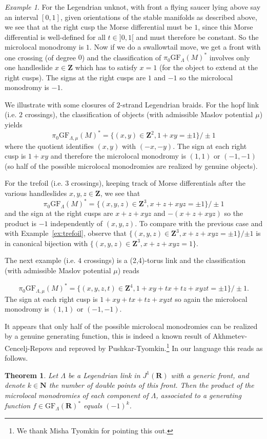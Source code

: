 \documentclass[12pt,a4paper]{article}
\numberwithin{equation}{section}
\newtheorem{thm}[equation]{Theorem}
\theoremstyle{definition}
\theoremstyle{remark}
\newtheorem{example}[equation]{Example}
\newcommand{\Z}{\mathbf{Z}}
\newcommand{\R}{\mathbf{R}}
\newcommand{\N}{\mathbf{N}}
\newcommand{\GF}{\mathrm{GF}}
\begin{document}
\begin{example}\label{ex:mumonunknot}
For the Legendrian unknot, with front a flying saucer lying above say an interval $[0,1]$, given orientations of the stable manifolds
as described above, we see that at the right cusp the Morse differential must be $1$, since this Morse
differential is well-defined for all $t\in]0,1[$ and must therefore be constant. So the microlocal monodromy is $1$.
Now if we do a swallowtail move, we get a front with one crossing (of degree $0$) and the classification of $\pi_0\GF_\Lambda(M)^*$
involves only one handleslide $x\in \Z$ which has to satisfy $x=1$ (for the object to extend at the right cusps).
The signs at the right cusps are $1$ and $-1$ so the microlocal monodromy is $-1$.
\end{example}

We illustrate with some  closures of $2$-strand Legendrian braids.
For the hopf link (i.e. $2$ crossings), the classification of objects (with admissible Maslov potential $\mu$) yields
\[\pi_0\GF_{\Lambda,\mu}(M)^*=\{(x,y)\in \Z^2, 1+xy=\pm 1\}/\pm 1\]
where the quotient identifies $(x,y)$ with $(-x,-y)$. The sign at each right cusp is $1+xy$ and therefore the
microlocal monodromy is $(1,1)$ or $(-1,-1)$ (so half of the possible
microlocal monodromies are realized by genuine objects).

For the trefoil (i.e. $3$ crossings), keeping track of Morse differentials after the various handleslides $x,y,z \in \Z$,
we see that
\[\pi_0\GF_{\Lambda}(M)^*=\{(x,y,z)\in \Z^3, x+z+xyz=\pm 1\}/\pm 1\]
and the sign at the right cusps are $x+z+xyz$ and $-(x+z+xyz)$ so the product is $-1$ independently of $(x,y,z)$.
To compare with the previous case and with Example~\ref{ex:trefoil}, observe that $\{(x,y,z)\in \Z^3, x+z+xyz=\pm 1\}/{\pm 1}$ is in canonical bijection with
$\{(x,y,z)\in \Z^3, x+z+xyz=1\}$.

The next example (i.e. $4$ crossings) is a (2,4)-torus link and the classification (with admissible Maslov potential $\mu$) reads

\[\pi_0\GF_{\Lambda,\mu}(M)^*=\{(x,y,z,t)\in \Z^4, 1+xy+tx+tz+xyzt=\pm 1\}/\pm 1.\]
The sign at each right cusp is $1+xy+tx+tz+xyzt$ so again the microlocal monodromy is $(1,1)$ or $(-1,-1)$.


It appears that only half of the possible microlocal monodromies can be realized by a genuine generating function, this is indeed
a known result of Akhmetev-Cencelj-Repovs  and reproved by Pushkar-Tyomkin.\footnote{We thank Misha Tyomkin for pointing this out.}
In our language this reads as follows.
\begin{thm}\cite{akhmetev_algebraic_2005,pushkar_enhanced_2021} \label{micromonodromies of gf}
Let $\Lambda$ be a Legendrian link in $J^1(\R)$ with a generic front, and denote $k\in \N$ the number
of double points of this front. Then the product of the microlocal monodromies of each component of $\Lambda$,
associated to a generating function $f\in \GF_\Lambda(\R)^*$ equals $(-1)^k$.
\end{thm}
\end{document}
